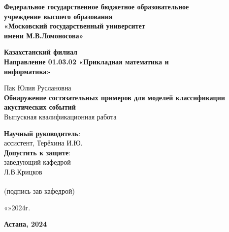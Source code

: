 \documentclass[12pt]{article}
\begin{document}
\begin{titlepage}
\begin{center}

\bigskip
\textbf{\large
Федеральное государственное бюджетное образовательное\\
учреждение высшего образования\\
«Московский государственный университет\\
имени М.В.Ломоносова»\\[5mm]
}

\textbf{\large
Казахстанский филиал\\
Направление 01.03.02 «Прикладная математика и\\
информатика»\\[10mm]
}

\bigskip
\bigskip

{\large Пак Юлия Руслановна}\\[10mm]
{\LARGE \textbf{Обнаружение состязательных примеров для моделей классификации акустических событий}}\\[10mm]

{\large Выпускная квалификационная работа}

\vfill

\begin{flushright}
\textbf{Научный руководитель}:\\
ассистент, Терёхина И.Ю.\\
\textbf{Допустить к защите}:\\
заведующий кафедрой \\
Л.В.Крицков \\
\underline{\hspace{3.5cm}} \\
(подпись зав кафедрой)

«\underline{\hspace{1.0cm}}»\underline{\hspace{3.5cm}}2024г.
\end{flushright}

\vfill

\textbf{Астана, 2024}
\end{center}
\end{titlepage}

\end{document}
